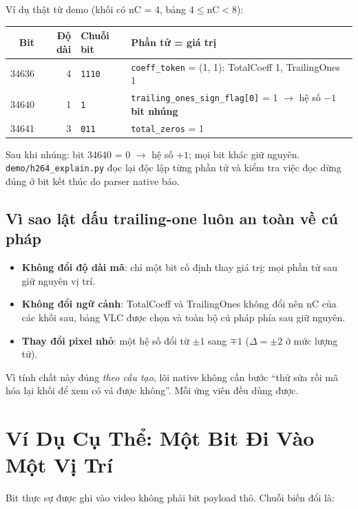\documentclass[11pt,a4paper]{article}
\begin{document}
Ví dụ thật từ demo (khối có nC = 4, bảng \(4 \le \mathrm{nC} < 8\)):

\begin{center}
\small
\begin{tabular}{rrll}
\toprule
Bit & Độ dài & Chuỗi bit & Phần tử = giá trị \\
\midrule
34636 & 4 & \texttt{1110} & \texttt{coeff\_token} = (1, 1): TotalCoeff 1, TrailingOnes 1 \\
34640 & 1 & \texttt{1} & \texttt{trailing\_ones\_sign\_flag[0]} = 1 \(\rightarrow\) hệ số \(-1\) \hfill \textbf{bit nhúng} \\
34641 & 3 & \texttt{011} & \texttt{total\_zeros} = 1 \\
\bottomrule
\end{tabular}
\end{center}

Sau khi nhúng: bit 34640 = 0 \(\rightarrow\) hệ số \(+1\); mọi bit khác giữ nguyên.
\texttt{demo/h264\_explain.py} đọc lại độc lập từng phần tử và kiểm tra việc đọc dừng
đúng ở bit kết thúc do parser native báo.

\subsection{Vì sao lật dấu trailing-one luôn an toàn về cú pháp}

\begin{itemize}[leftmargin=*]
  \item \textbf{Không đổi độ dài mã}: chỉ một bit cố định thay giá trị; mọi phần tử
  sau giữ nguyên vị trí.
  \item \textbf{Không đổi ngữ cảnh}: TotalCoeff và TrailingOnes không đổi nên nC của
  các khối sau, bảng VLC được chọn và toàn bộ cú pháp phía sau giữ nguyên.
  \item \textbf{Thay đổi pixel nhỏ}: một hệ số đổi từ \(\pm1\) sang \(\mp1\)
  (\(\Delta = \pm2\) ở mức lượng tử).
\end{itemize}

Vì tính chất này đúng \emph{theo cấu tạo}, lõi native không cần bước ``thử sửa rồi
mã hóa lại khối để xem có vá được không''. Mỗi ứng viên đều dùng được.

\section{Ví Dụ Cụ Thể: Một Bit Đi Vào Một Vị Trí}
\label{sec:one-bit}

Bit thực sự được ghi vào video không phải bit payload thô. Chuỗi biến đổi là:
\end{document}
